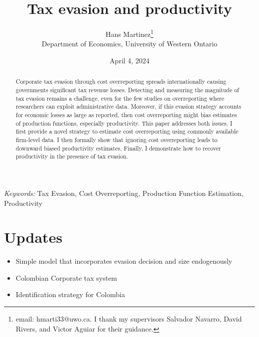 \documentclass[
  12pt]{article}
\providecommand{\tightlist}{%
  \setlength{\itemsep}{0pt}\setlength{\parskip}{0pt}}\usepackage{longtable,booktabs,array}
\theoremstyle{definition}
\theoremstyle{remark}
\begin{document}
\def\spacingset#1{\renewcommand{\baselinestretch}%
{#1}\small\normalsize} \spacingset{1}



\date{April 4, 2024}
\title{\bf Tax evasion and productivity}
\author{
Hans Martinez\thanks{email: hmarti33@uwo.ca. I thank my supervisors
Salvador Navarro, David Rivers, and Victor Aguiar for their guidance.}\\
Department of Economics, University of Western Ontario\\
}
\maketitle

\bigskip
\bigskip
\begin{abstract}
Corporate tax evasion through cost overreporting spreads internationally
causing governments significant tax revenue losses. Detecting and
measuring the magnitude of tax evasion remains a challenge, even for the
few studies on overreporting where researchers can exploit
administrative data. Moreover, if this evasion strategy accounts for
economic losses as large as reported, then cost overreporting might bias
estimates of production functions, especially productivity. This paper
addresses both issues. I first provide a novel strategy to estimate cost
overreporting using commonly available firm-level data. I then formally
show that ignoring cost overreporting leads to downward biased
productivity estimates. Finally, I demonstrate how to recover
productivity in the presence of tax evasion.
\end{abstract}

\noindent%
{\it Keywords:} Tax Evasion, Cost Overreporting, Production Function
Estimation, Productivity
\vfill

\newpage
\spacingset{1.9} %

\section*{Updates}\label{updates}

\begin{itemize}
\tightlist
\item
  Simple model that incorporates evasion decision and size endogenously
\item
  Colombian Corporate tax system
\item
  Identification strategy for Colombia
\end{itemize}
\end{document}
